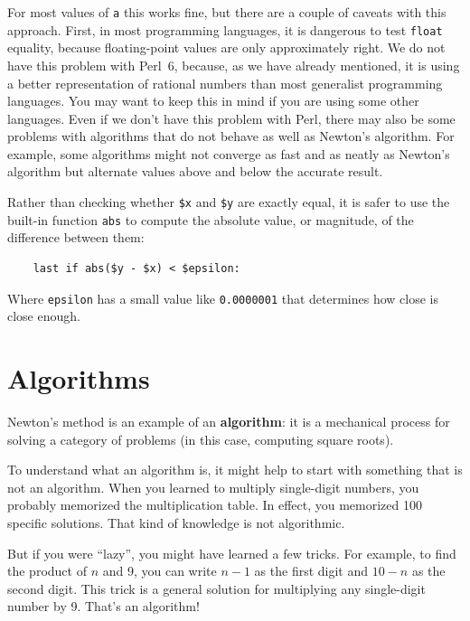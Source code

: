 For most values of {\tt a} this works fine, but there are a 
couple of caveats with this approach. First, in most programming 
languages, it is dangerous to test {\tt float} equality, because 
floating-point values are only approximately right. We do not 
have this problem with Perl~6, because, as we have already 
mentioned, it is using a better representation of rational 
numbers than most generalist programming languages. You 
may want to keep this in mind if you are using some other
languages. Even if we don't have this problem with Perl, there 
may also be some problems with algorithms that do not behave 
as well as Newton's algorithm. For example, some algorithms 
might not converge as fast and as neatly as Newton's algorithm but alternate values above and below the accurate result.

Rather than checking whether {\tt \$x} and {\tt \$y} are exactly equal, it
is safer to use the built-in function {\tt abs} to compute the
absolute value, or magnitude, of the difference between them:

\begin{verbatim}
    last if abs($y - $x) < $epsilon:
\end{verbatim}
%
Where \verb"epsilon" has a small value like {\tt 0.0000001} that
determines how close is close enough.



\section{Algorithms}

Newton's method is an example of an {\bf algorithm}: it is a
mechanical process for solving a category of problems (in this
case, computing square roots).

To understand what an algorithm is, it might help to start with
something that is not an algorithm.  When you learned to multiply
single-digit numbers, you probably memorized the multiplication table.
In effect, you memorized 100 specific solutions.  That kind of
knowledge is not algorithmic.

But if you were ``lazy'', you might have learned a few
tricks.  For example, to find the product of $n$ and 9, you can
write $n-1$ as the first digit and $10-n$ as the second
digit.  This trick is a general solution for multiplying any
single-digit number by 9.  That's an algorithm!

